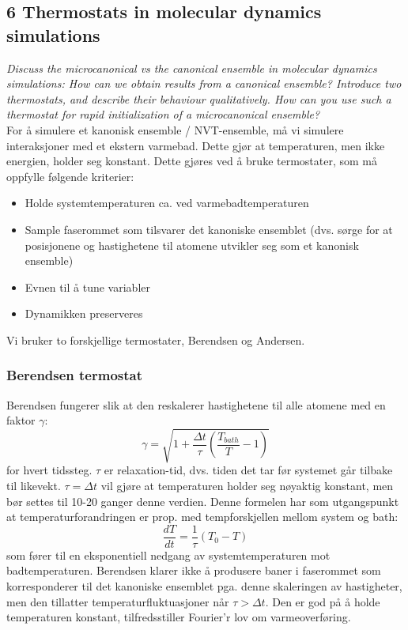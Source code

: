 \documentclass[english, a4paper]{article}
\begin{document}
\subsection{6 Thermostats in molecular dynamics simulations}
\textit{Discuss the microcanonical vs the canonical ensemble in molecular dynamics simulations:
How can we obtain results from a canonical ensemble? Introduce two thermostats, and describe their
behaviour qualitatively. How can you use such a thermostat for rapid initialization of a microcanonical
ensemble?} \\

\noindent
For å simulere et kanonisk ensemble / NVT-ensemble, må vi simulere interaksjoner med et 
ekstern varmebad. Dette gjør at temperaturen, men ikke energien, holder seg konstant. Dette gjøres ved
å bruke termostater, som må oppfylle følgende kriterier:
\begin{itemize}
 \item Holde systemtemperaturen ca. ved varmebadtemperaturen
 \item Sample faserommet som tilsvarer det kanoniske ensemblet (dvs. sørge for 
       at posisjonene og hastighetene til atomene utvikler seg som et kanonisk ensemble)
 \item Evnen til å tune variabler
 \item Dynamikken preserveres
\end{itemize}
Vi bruker to forskjellige termostater, Berendsen og Andersen. 

\subsubsection{Berendsen termostat}
Berendsen fungerer slik at den reskalerer hastighetene til alle atomene med en faktor $\gamma$:
\begin{equation}
 \gamma = \sqrt{1 + \frac{\Delta t}{\tau}\left(\frac{T_{bath}}{T} - 1\right)}
\end{equation}
for hvert tidssteg. $\tau$ er relaxation-tid, dvs. tiden det tar før systemet går tilbake til likevekt.
$\tau = \Delta t$ vil gjøre at temperaturen holder seg nøyaktig konstant, men bør settes til 
10-20 ganger denne verdien. 
Denne formelen har som utgangspunkt at temperaturforandringen er prop. med tempforskjellen mellom system
og bath:
\begin{equation}
 \frac{dT}{dt} = \frac{1}{\tau}(T_0 - T)
\end{equation}
som fører til en eksponentiell nedgang av systemtemperaturen mot badtemperaturen. 
Berendsen klarer
ikke å produsere baner i faserommet som korresponderer til det kanoniske ensemblet pga.
denne skaleringen av hastigheter, men den tillatter temperaturfluktuasjoner når $\tau  > \Delta t$.
Den er god på å holde
temperaturen konstant, tilfredsstiller Fourier'r lov om varmeoverføring. 
\end{document}
